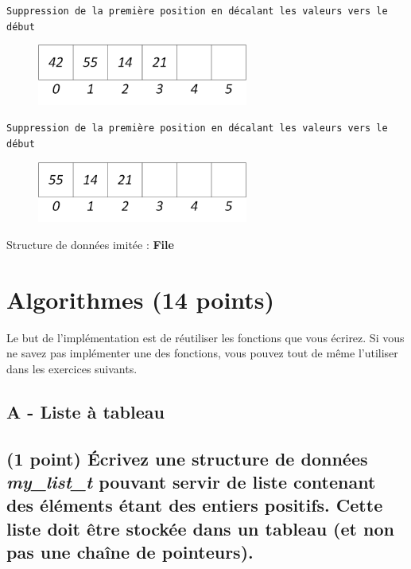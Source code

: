 \documentclass[11pt,a4paper]{article}
\begin{document}
\begin{center}
\texttt{Suppression de la première position en décalant les valeurs vers le début}

\begin{figure}[ht!]
\centering
\centerline{  %
\includegraphics[height=2cm]{img/f-5-Liste_t_4.png}
}
\end{figure}


\texttt{Suppression de la première position en décalant les valeurs vers le début}

\begin{figure}[ht!]
\centering
\centerline{  %
\includegraphics[height=2cm]{img/f-6-Liste_t_3.png}
}
\end{figure}


\end{center}

Structure de données imitée : \textbf{File}

\bigskip



\newpage

%
\section{Algorithmes (14 points)}

Le but de l'implémentation est de réutiliser les fonctions que vous écrirez.
Si vous ne savez pas implémenter une des fonctions, vous pouvez tout de même l'utiliser dans les exercices suivants.

\vfillFirst

\subsection*{A - Liste à tableau}

\subsection{(1 point) \'Ecrivez une structure de données \og \textit{my\_list\_t} \fg{} pouvant servir de liste contenant des éléments étant des entiers positifs. Cette liste doit être stockée dans un tableau (et non pas une chaîne de pointeurs). }
\end{document}
